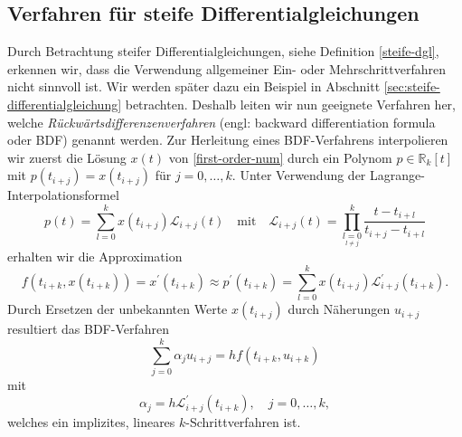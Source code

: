\subsection{Verfahren für steife Differentialgleichungen}
Durch Betrachtung steifer Differentialgleichungen, siehe Definition \ref{steife-dgl}, erkennen wir, dass
die Verwendung allgemeiner Ein- oder Mehrschrittverfahren nicht sinnvoll ist. Wir werden später dazu ein Beispiel in
Abschnitt \ref{sec:steife-differentialgleichung} betrachten. Deshalb leiten wir nun geeignete Verfahren her, welche
\textit{Rückwärtsdifferenzenverfahren} (engl: backward differentiation formula oder BDF) genannt werden. Zur
Herleitung eines BDF-Verfahrens interpolieren wir zuerst die Lösung $x(t)$ von \eqref{first-order-num} durch ein Polynom
$p \in \mathbb{R}_k[t]$ mit $p(t_{i+j}) = x(t_{i+j})$ für $j=0, \dots, k$. Unter Verwendung der Lagrange-Interpolationsformel
\[
    p(t) = \sum_{l=0}^{k} x(t_{i+j}) \mathcal{L}_{i+j}(t) \quad \text{mit} \quad
    \mathcal{L}_{i+j}(t) = \prod\limits_{\underset{l \neq j}{l=0}}^{k} \frac{t-t_{i+l}}{t_{i+j}-t_{i+l}}
\]
erhalten wir die Approximation
\[
    f(t_{i+k},x(t_{i+k})) = x^{\prime}(t_{i+k}) \approx p^{\prime}(t_{i+k})
    = \sum_{l=0}^{k} x(t_{i+j})\mathcal{L}^{\prime}_{i+j}(t_{i+k}).
\]
Durch Ersetzen der unbekannten Werte $x(t_{i+j})$ durch Näherungen $u_{i+j}$ resultiert das BDF-Verfahren
\[
    \sum_{j=0}^{k}\alpha_j u_{i+j} = h f(t_{i+k}, u_{i+k})
\]
mit
\[
    \alpha_j = h \mathcal{L}^{\prime}_{i+j} (t_{i+k}), \quad j=0,\dots,k,
\]
welches ein implizites, lineares $k$-Schrittverfahren ist.
\newpage
